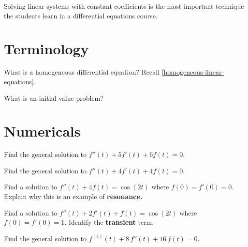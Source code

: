 \documentclass{homework}
\author{Jim Fowler}
\begin{document}
\maketitle

\begin{inspiration}
  Solving linear systems with constant coefficients is the most
  important technique the students learn in a differential equations
  course.
\end{inspiration}

\section{Terminology}

\begin{problem}
  What is a homogeneous differential equation?  Recall \ref{homogeneous-linear-equations}.
\end{problem}

\begin{problem}
  What is an initial value problem?
\end{problem}

\section{Numericals}

\begin{problem}
  Find the general solution to $f''(t) + 5 f'(t) + 6 f(t) = 0$.
\end{problem}

\begin{problem}
  Find the general solution to $f''(t) + 4 f'(t) + 4 f(t) = 0$.
\end{problem}

\begin{problem}
  Find a solution to $f''(t) + 4 f(t) = \cos (2t)$ where $f(0) = f'(0) = 0$.  Explain why this is an example of \textbf{resonance.}
\end{problem}

\begin{problem}
  Find a solution to $f''(t) + 2f'(t) + f(t) = \cos (2t)$ where $f(0) = f'(0) = 1$.  Identify the \textbf{transient} term.
\end{problem}

\begin{problem}
  Find the general solution to $f^{(4)}(t) + 8\,f''(t) + 16\,f(t) = 0$.
\end{problem}
\end{document}
